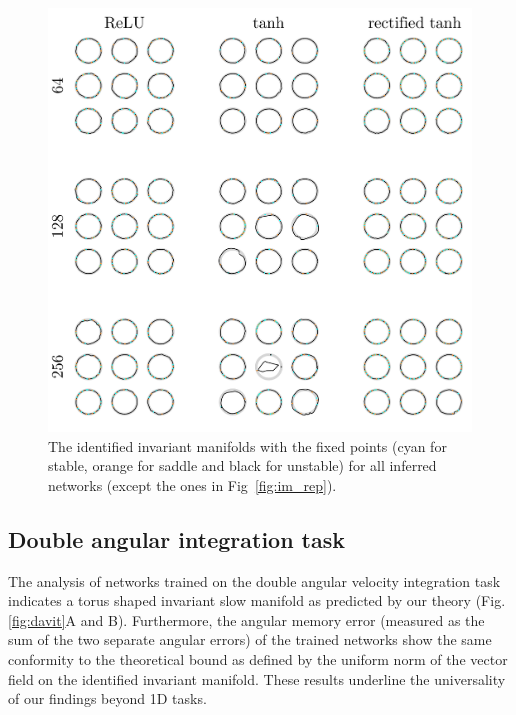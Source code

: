 \documentclass{article} %
\newcounter{ct}
\theoremstyle{definition}
\theoremstyle{remark}
\begin{document}
\newpage
\begin{figure}[tbhp]
     \centering
    \includegraphics[width=\textwidth]{im_all_3x3}
       \caption{The identified invariant manifolds with the fixed points (cyan for stable, orange for saddle and black for unstable) for all inferred networks (except the ones in Fig~\ref{fig:im_rep}).}\label{fig:im_all}
\end{figure}



\newpage
\subsection{Double angular integration task}

The analysis of networks trained on the double angular velocity integration task indicates a torus shaped invariant slow manifold as predicted by our theory (Fig.\ref{fig:davit}A and B).
Furthermore, the angular memory error (measured as the sum of the two separate angular errors) of the trained networks show the same conformity to the theoretical bound as defined by the uniform norm of the vector field on the identified invariant manifold.
These results underline the universality of our findings beyond 1D tasks.
\end{document}

